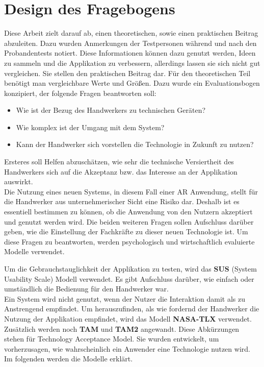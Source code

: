 \section{Design des Fragebogens}

Diese Arbeit zielt darauf ab, einen theoretischen, sowie einen praktischen Beitrag abzuleiten. Dazu wurden Anmerkungen der Testpersonen während und nach den Probandentests notiert. Diese Informationen können dazu genutzt werden, Ideen zu sammeln und die Applikation zu verbessern, allerdings lassen sie sich nicht gut vergleichen. Sie stellen den praktischen Beitrag dar. Für den theoretischen Teil benötigt man vergleichbare Werte und Größen. Dazu wurde ein Evaluationsbogen konzipiert, der folgende Fragen beantworten soll:

\begin{itemize}
	\item Wie ist der Bezug des Handwerkers zu technischen Geräten?
	\item Wie komplex ist der Umgang mit dem System?
	\item Kann der Handwerker sich vorstellen die Technologie in Zukunft zu nutzen?
\end{itemize}

Ersteres soll Helfen abzuschätzen, wie sehr die technische Versiertheit des Handwerkers sich auf die Akzeptanz bzw. das Interesse an der Applikation auswirkt. \\
Die Nutzung eines neuen Systems, in diesem Fall einer AR Anwendung, stellt für die Handwerker aus unternehmerischer Sicht eine Risiko dar. Deshalb ist es essentiell bestimmen zu können, ob die Anwendung von den Nutzern akzeptiert und genutzt werden wird. Die beiden weiteren Fragen sollen Aufschluss darüber geben, wie die Einstellung der Fachkräfte zu dieser neuen Technologie ist. Um diese Fragen zu beantworten, werden psychologisch und wirtschaftlich evaluierte Modelle verwendet. 

Um die Gebrauchstauglichkeit der Applikation zu testen, wird das \textbf{SUS} (System Usability Scale) \cite{brooke_sus_nodate} Modell verwendet. Es gibt Aufschluss darüber, wie einfach oder umständlich die Bedienung für den Handwerker war. \\
Ein System wird nicht genutzt, wenn der Nutzer die Interaktion damit als zu Anstrengend empfindet. Um herauszufinden, als wie fordernd der Handwerker die Nutzung der Applikation empfindet, wird das Modell \textbf{NASA-TLX} verwendet. \\
Zusätzlich werden noch \textbf{TAM} und \textbf{TAM2} angewandt. Diese Abkürzungen stehen für Technology Acceptance Model. Sie wurden entwickelt, um vorherzusagen, wie wahrscheinlich ein Anwender eine Technologie nutzen wird. \\
Im folgenden werden die Modelle erklärt.

